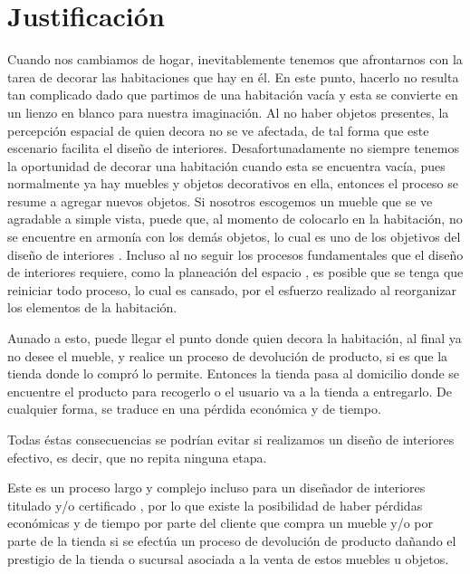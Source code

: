 \section{Justificación}
Cuando nos cambiamos de hogar, inevitablemente tenemos que afrontarnos con la tarea de decorar las habitaciones que hay en él. En este punto, hacerlo no resulta tan complicado dado que partimos de una habitación vacía y esta se convierte en un lienzo en blanco para nuestra imaginación. Al no haber objetos presentes, la percepción espacial de quien decora no se ve afectada, de tal forma que este escenario facilita el diseño de interiores. Desafortunadamente no siempre tenemos la oportunidad de decorar una habitación cuando esta se encuentra vacía, pues normalmente ya hay muebles y objetos decorativos en ella, entonces el proceso se resume a agregar nuevos objetos. Si nosotros escogemos un mueble que se ve agradable a simple vista, puede que, al momento de colocarlo en la habitación, no se encuentre en armonía con los demás objetos, lo cual es uno de los objetivos del diseño de interiores \cite{B01}. Incluso al no seguir los procesos fundamentales que el diseño de interiores requiere, como la planeación del espacio \cite{B02}, es posible que se tenga que reiniciar todo proceso, lo cual es cansado, por el esfuerzo realizado al reorganizar los elementos de la habitación.\par 
Aunado a esto, puede llegar el punto donde quien decora la habitación, al final ya no desee el mueble, y realice un proceso de devolución de producto, si es que la tienda donde lo compró lo permite. Entonces la tienda pasa al domicilio donde se encuentre el producto para recogerlo o el usuario va a la tienda a entregarlo. De cualquier forma, se traduce en una pérdida económica y de tiempo.\par 
Todas éstas consecuencias se podrían evitar si realizamos un diseño de interiores efectivo, es decir, que no repita ninguna etapa.\par
Este es un proceso largo y complejo incluso para un diseñador de interiores titulado y/o certificado \cite{B02}, por lo que existe la posibilidad de haber pérdidas económicas y de tiempo por parte del cliente que compra un mueble y/o por parte de la tienda si se efectúa un proceso de devolución de producto dañando el prestigio de la tienda o sucursal asociada a la venta de estos muebles u objetos.\par
